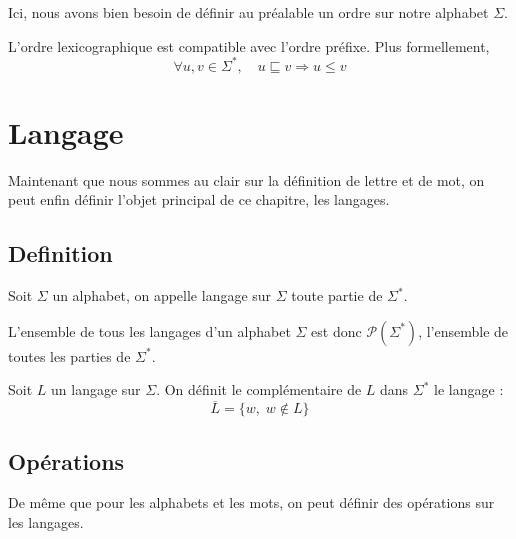 \begin{remark}
    Ici, nous avons bien besoin de définir au préalable un ordre sur notre alphabet $\Sigma$. 
\end{remark}

\begin{prop}[Compatibilité]
    L'ordre lexicographique est compatible avec l'ordre préfixe. Plus formellement, 
        \[ \forall u,v \in \Sigma^*, \quad u \sqsubseteq v \Longrightarrow u \leqslant v \] 
\end{prop}




\section{Langage}

Maintenant que nous sommes au clair sur la définition de lettre et de mot, on peut enfin définir l'objet 
principal de ce chapitre, les langages. 

\subsection{Definition}

\begin{definition}[Langage]
    Soit $\Sigma$ un alphabet, on appelle langage sur $\Sigma$ toute partie 
    de $\Sigma^*$. 
\end{definition}

\begin{remark}
    L'ensemble de tous les langages d'un alphabet $\Sigma$ est donc $\mathcal{P}(\Sigma^*)$, 
    l'ensemble de toutes les parties de $\Sigma^*$. 
\end{remark}

\begin{definition}[Complémentaire]
    Soit $L$ un langage sur $\Sigma$. On définit le complémentaire de $L$ dans $\Sigma^*$ le langage :
        \[ \overline{L} = \{w, \; w \not \in L\} \] 
\end{definition}

\subsection{Opérations}

De même que pour les alphabets et les mots, on peut définir des opérations sur les langages. 

